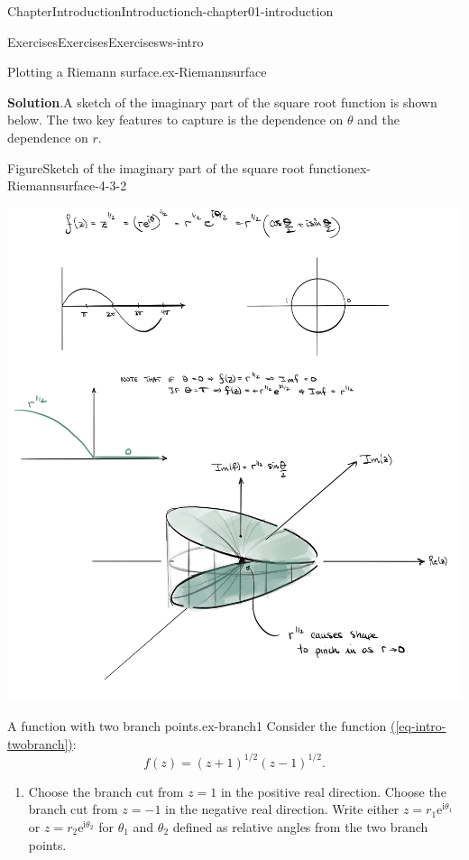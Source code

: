\documentclass[oneside,10pt,]{book}
\newcommand{\blocktitlefont}{\relax}
\newcommand{\xreffont}{\relax}
\numberwithin{equation}{section}
\newcommand{\e}{\mathrm{e}}
\newcommand{\im}{\mathrm{i}}
\begin{document}
\begin{chapterptx}{Chapter}{Introduction}{}{Introduction}{}{}{ch-chapter01-introduction}
\begin{exercises-section}{Exercises}{Exercises}{}{Exercises}{}{}{ws-intro}
\begin{divisionexercise}{1}{Plotting a Riemann surface.}{}{ex-Riemannsurface}
\begin{enumerate}[font=\bfseries,label=(\alph*),ref=\alph*]
\noindent\textbf{\blocktitlefont Solution}.\hypertarget{ex-Riemannsurface-4-3}{}\quad{}A sketch of the imaginary part of the square root function is shown below. The two key features to capture is the dependence on \(\theta\) and the dependence on \(r\).%
\begin{figureptx}{Figure}{Sketch of the imaginary part of the square root function}{ex-Riemannsurface-4-3-2}{}%
\begin{image}{0.1}{0.8}{0.1}{}%
\includegraphics[width=\linewidth]{external/intro_squareroot.jpg}
\end{image}%
\tcblower
\end{figureptx}%
\end{enumerate}%
\end{divisionexercise}%
\begin{divisionexercise}{2}{A function with two branch points.}{}{ex-branch1}%
Consider the function \hyperref[eq-intro-twobranch]{({\xreffont\ref{eq-intro-twobranch}})}:%
\begin{equation*}
f(z) = (z + 1)^{1/2} (z - 1)^{1/2}.
\end{equation*}
%
\begin{enumerate}[font=\bfseries,label=(\alph*),ref=\alph*]%
\item{}Choose the branch cut from \(z = 1\) in the positive real direction. Choose the branch cut from \(z = -1\) in the negative real direction. Write either \(z = r_1 \e^{\im\theta_1}\) or \(z = r_2 \e^{\im\theta_2}\) for \(\theta_1\) and \(\theta_2\) defined as relative angles from the two branch points.%

\end{enumerate}
\end{divisionexercise}
\end{exercises-section}
\end{chapterptx}
\end{document}

